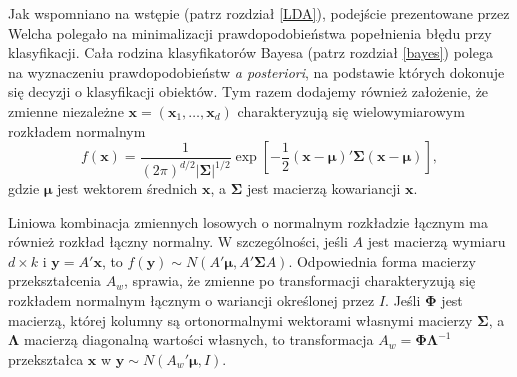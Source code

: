 \documentclass[]{book}
\theoremstyle{plain}
\theoremstyle{definition}
\theoremstyle{definition}
\theoremstyle{definition}
\theoremstyle{definition}
\theoremstyle{remark}
\let\BeginKnitrBlock\begin \let\EndKnitrBlock\end
\begin{document}
Jak wspomniano na wstępie (patrz rozdział \ref{LDA}), podejście prezentowane przez Welcha polegało na minimalizacji prawdopodobieństwa popełnienia błędu przy klasyfikacji. Cała rodzina klasyfikatorów Bayesa (patrz rozdział \ref{bayes}) polega na wyznaczeniu prawdopodobieństw \emph{a posteriori}, na podstawie których dokonuje się decyzji o klasyfikacji obiektów. Tym razem dodajemy również założenie, że zmienne niezależne \(\boldsymbol{x}=(\boldsymbol{x}_1,\ldots,\boldsymbol{x}_d)\) charakteryzują się wielowymiarowym rozkładem normalnym
\begin{equation}
    f(\boldsymbol{x}) = \frac{1}{(2\pi)^{d/2}|\boldsymbol{\Sigma}|^{1/2}}\exp\left[-\frac{1}{2}(\boldsymbol{x}-\boldsymbol{\mu})'\boldsymbol{\Sigma}(\boldsymbol{x}-\boldsymbol{\mu})\right],
    \label{eq:mnv}
\end{equation}
gdzie \(\boldsymbol{\mu}\) jest wektorem średnich \(\boldsymbol{x}\), a \(\boldsymbol{\Sigma}\) jest macierzą kowariancji \(\boldsymbol{x}\).

\BeginKnitrBlock{remark}
{}Liniowa kombinacja zmiennych losowych o normalnym rozkładzie łącznym ma również rozkład łączny normalny. W szczególności, jeśli \(A\) jest macierzą wymiaru \(d\times k\) i \(\boldsymbol{y} = A'\boldsymbol{x}\), to \(f(\boldsymbol{y})\sim N(A'\boldsymbol{\mu}, A'\boldsymbol{\Sigma}A)\). Odpowiednia forma macierzy przekształcenia \(A_w\), sprawia, że zmienne po transformacji charakteryzują się rozkładem normalnym łącznym o wariancji określonej przez \(I\). Jeśli \(\boldsymbol{\Phi}\) jest macierzą, której kolumny są ortonormalnymi wektorami własnymi macierzy \(\boldsymbol{\Sigma}\), a \(\boldsymbol{\Lambda}\) macierzą diagonalną wartości własnych, to transformacja \(A_w=\boldsymbol{\Phi}\boldsymbol{\Lambda}^{-1}\) przekształca \(\boldsymbol{x}\) w \(\boldsymbol{y}\sim N(A_w'\boldsymbol{\mu}, I)\).
\EndKnitrBlock{remark}
\end{document}
